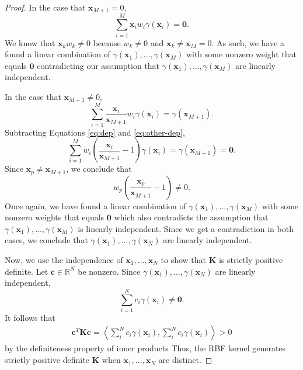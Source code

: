 \begin{proof}
    In the case that $\mathbf{x}_{M + 1} = 0$,
    \begin{equation*}
        \sum\limits_{i=1}^{M} \mathbf{x}_i w_i \gamma(\mathbf{x}_i) = \mathbf{0}.
    \end{equation*}
    We know that $\mathbf{x}_k w_k \neq 0$ because $w_k \neq 0$ and $\mathbf{x}_k \neq \mathbf{x}_M = 0$. 
    As such, we have a found a linear combination of $\gamma(\mathbf{x}_1), \dots, \gamma(\mathbf{x}_M)$ with some nonzero weight that equals $\mathbf{0}$ contradicting our assumption that $\gamma(\mathbf{x}_1), \dots, \gamma(\mathbf{x}_M)$ are linearly independent.

    In the case that $\mathbf{x}_{M + 1} \neq 0$, 
    \begin{equation}\label{eq:other-dep}
        \sum\limits_{i=1}^{M} \frac{\mathbf{x}_i}{\mathbf{x}_{M + 1}} w_i \gamma(\mathbf{x}_i) = \gamma(\mathbf{x}_{M + 1}).
    \end{equation}
    Subtracting Equations \ref{eq:dep} and \ref{eq:other-dep},
    \begin{equation*}
        \sum\limits_{i=1}^{M} w_i \left(\frac{\mathbf{x}_i}{\mathbf{x}_{M + 1}} - 1\right) \gamma(\mathbf{x}_i) = \gamma(\mathbf{x}_{M + 1}) = \mathbf{0}.
    \end{equation*}
    Since $\mathbf{x}_p \neq \mathbf{x}_{M + 1}$, we conclude that
    \begin{equation*}
        w_p\left(\frac{ \mathbf{x}_p }{ \mathbf{x}_{M + 1} } - 1\right) \neq 0.
    \end{equation*}
    Once again, we have found a linear combination of $\gamma(\mathbf{x}_1), \dots, \gamma(\mathbf{x}_M)$ with some nonzero weights that equals $\mathbf{0}$ which also contradicts the assumption that $\gamma(\mathbf{x}_1), \dots, \gamma(\mathbf{x}_M)$ is linearly independent.
    Since we get a contradiction in both cases, we conclude that $\gamma(\mathbf{x}_1), \dots, \gamma(\mathbf{x}_N)$ are linearly independent.

    Now, we use the independence of $\mathbf{x}_1, \dots, \mathbf{x}_N$ to show that $\mathbf{K}$ is strictly positive definite.
    Let $\mathbf{c} \in \mathbb{R}^{N}$ be nonzero.
    Since $\gamma(\mathbf{x}_1), \dots, \gamma(\mathbf{x}_N)$ are linearly independent,
    \begin{equation*}
        \sum\limits_{i = 1}^{N} c_i \gamma(\mathbf{x}_i) \neq \mathbf{0}.
    \end{equation*}
    It follows that
    \begin{align*}
        \mathbf{c}^{T} \mathbf{K} \mathbf{c}
        = \left\langle \sum\limits_{i}^{N} c_i \gamma(\mathbf{x}_i), \sum\limits_{i}^{N} c_i \gamma(\mathbf{x}_i) \right\rangle
        > 0
    \end{align*}
    by the definiteness property of inner products
    Thus, the RBF kernel generates strictly positive definite $\mathbf{K}$ when $\mathbf{x}_1, \dots, \mathbf{x}_N$
    are distinct.
\end{proof}


